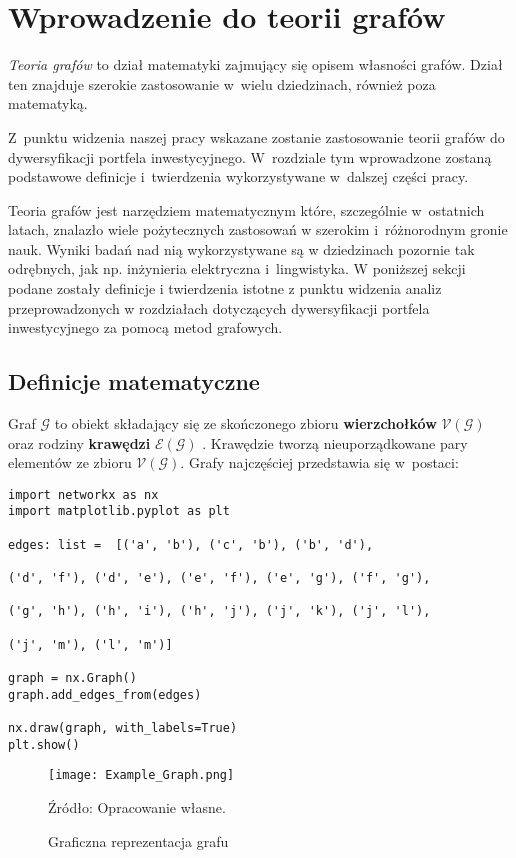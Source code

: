 \documentclass[12pt,a4paper,twoside,openany]{book}
\begin{document}
\section{Wprowadzenie do teorii grafów}

\textit{Teoria grafów} to dział matematyki zajmujący się opisem własności grafów. 
Dział ten znajduje szerokie zastosowanie w~wielu dziedzinach, również poza matematyką. 

Z~punktu widzenia naszej pracy wskazane zostanie zastosowanie teorii grafów do dywersyfikacji portfela inwestycyjnego.
W~rozdziale tym wprowadzone zostaną podstawowe definicje i~twierdzenia wykorzystywane w~dalszej części pracy. 


Teoria grafów jest narzędziem matematycznym które, szczególnie w~ostatnich latach, znalazło wiele pożytecznych zastosowań w szerokim i~różnorodnym gronie nauk. 
Wyniki badań nad nią wykorzystywane są w dziedzinach pozornie tak odrębnych, jak np. inżynieria elektryczna i~lingwistyka. 
W poniższej sekcji podane zostały definicje i twierdzenia istotne z punktu widzenia analiz przeprowadzonych w rozdziałach dotyczących dywersyfikacji portfela inwestycyjnego za pomocą metod grafowych.


\subsection{Definicje matematyczne}

Graf $\mathcal{G}$ to obiekt składający się ze skończonego zbioru \textbf{wierzchołków} $\mathcal{V} (\mathcal{G})$ oraz rodziny \textbf{krawędzi} $\mathcal{E}(\mathcal{G})$ \cite{}. 
Krawędzie tworzą nieuporządkowane pary elementów ze zbioru $\mathcal{V} (\mathcal{G})$.
Grafy najczęściej przedstawia się w~postaci:

\begin{verbatim}
import networkx as nx
import matplotlib.pyplot as plt

edges: list =  [('a', 'b'), ('c', 'b'), ('b', 'd'), 

('d', 'f'), ('d', 'e'), ('e', 'f'), ('e', 'g'), ('f', 'g'), 

('g', 'h'), ('h', 'i'), ('h', 'j'), ('j', 'k'), ('j', 'l'), 

('j', 'm'), ('l', 'm')]

graph = nx.Graph()
graph.add_edges_from(edges)

nx.draw(graph, with_labels=True)
plt.show()

\end{verbatim}
\begin{figure}[h]
\centering 
\caption{Graficzna reprezentacja grafu} 
\label{rys3.1} 
\vskip0.1cm
\texttt{[image: Example\_Graph.png]}
\centerline{\scriptsize Źródło: Opracowanie własne.}
\end{figure}
\end{document}
